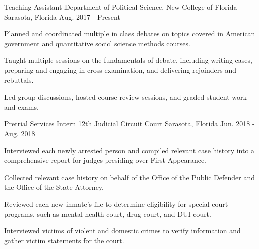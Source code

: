 

\begin{cventries}

    \cventry
      {Teaching Assistant} %
      {Department of Political Science, New College of Florida} %
      {Sarasota, Florida} %
      {Aug. 2017 - Present} %
      {
        \begin{cvitems} %
          \item {Planned and coordinated multiple in class debates on topics covered in American government and quantitative socicl science methods courses.}
          \item {Taught multiple sessions on the fundamentals of debate, including writing cases, preparing and engaging in cross examination, and delivering rejoinders and rebuttals.}
          \item {Led group discussions, hosted course review sessions, and graded student work and exams.}
        \end{cvitems}
      }

  \cventry
    {Pretrial Services Intern} %
    {12th Judicial Circuit Court} %
    {Sarasota, Florida} %
    {Jun. 2018 - Aug. 2018} %
    {
      \begin{cvitems} %
        \item {Interviewed each newly arrested person and compiled relevant case history into a comprehensive report for judges presiding over First Appearance.}
        \item {Collected relevant case history on behalf of the Office of the Public Defender and the Office of the State Attorney.}
        \item {Reviewed each new inmate’s file to determine eligibility for special court programs, such as mental health court, drug court, and DUI court.}
        \item {Interviewed victims of violent and domestic crimes to verify information and gather victim statements for the court.}
      \end{cvitems}
    }


\end{cventries}
